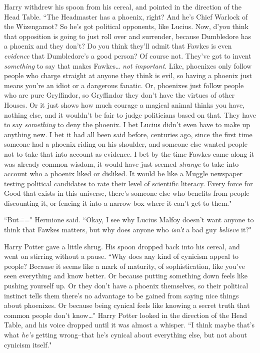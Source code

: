 Harry withdrew his spoon from his cereal, and pointed in the direction of the Head Table. ``The Headmaster has a phoenix, right? And he's Chief Warlock of the Wizengamot? So he's got political opponents, like Lucius. Now, d'you think that opposition is going to just roll over and surrender, because Dumbledore has a phoenix and they don't? Do you think they'll admit that Fawkes is even \emph{evidence} that Dumbledore's a good person? Of course not. They've got to invent \emph{something} to say that makes Fawkes{\ldots} \emph{not important}. Like, phoenixes only follow people who charge straight at anyone they think is evil, so having a phoenix just means you're an idiot or a dangerous fanatic. Or, phoenixes just follow people who are pure Gryffindor, so Gryffindor they don't have the virtues of other Houses. Or it just shows how much courage a magical animal thinks you have, nothing else, and it wouldn't be fair to judge politicians based on that. They have to say \emph{something} to deny the phoenix. I bet Lucius didn't even have to make up anything new. I bet it had all been said before, centuries ago, since the first time someone had a phoenix riding on his shoulder, and someone else wanted people not to take that into account as evidence. I bet by the time Fawkes came along it was already common wisdom, it would have just seemed \emph{strange} to take into account who a phoenix liked or disliked. It would be like a Muggle newspaper testing political candidates to rate their level of scientific literacy. Every force for Good that exists in this universe, there's someone else who benefits from people discounting it, or fencing it into a narrow box where it can't get to them."

``But\===" Hermione said. ``Okay, I see why Lucius Malfoy doesn't want anyone to think that Fawkes matters, but why does anyone who \emph{isn't} a bad guy \emph{believe} it?"

Harry Potter gave a little shrug. His spoon dropped back into his cereal, and went on stirring without a pause. ``Why does any kind of cynicism appeal to people? Because it seems like a mark of maturity, of sophistication, like you've seen everything and know better. Or because putting something down feels like pushing yourself up. Or they don't have a phoenix themselves, so their political instinct tells them there's no advantage to be gained from saying nice things about phoenixes. Or because being cynical feels like knowing a secret truth that common people don't know{\ldots}" Harry Potter looked in the direction of the Head Table, and his voice dropped until it was almost a whisper. ``I think maybe that's what \emph{he's} getting wrong\---that he's cynical about everything else, but not about cynicism itself."

